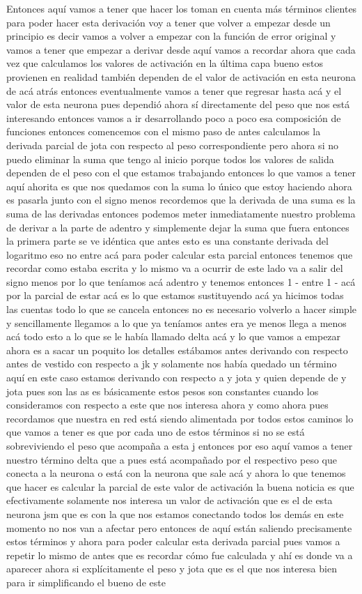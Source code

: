 Entonces aquí vamos a tener que hacer los toman en cuenta más términos clientes para poder hacer esta derivación voy a tener que volver a empezar desde un principio es decir vamos a volver a empezar con la función de error original y vamos a tener que empezar a derivar desde aquí vamos a recordar ahora que cada vez que calculamos los valores de activación en la última capa bueno estos provienen en realidad también dependen de el valor de activación en esta neurona de acá atrás entonces eventualmente vamos a tener que regresar hasta acá y el valor de esta neurona pues dependió ahora sí directamente del peso que nos está interesando entonces vamos a ir desarrollando poco a poco esa composición de funciones entonces comencemos con el mismo paso de antes calculamos la derivada parcial de jota con respecto al peso correspondiente pero ahora si no puedo eliminar la suma que tengo al inicio porque todos los valores de salida dependen de el peso con el que estamos trabajando entonces lo que vamos a tener aquí ahorita es que nos quedamos con la suma lo único que estoy haciendo ahora es pasarla junto con el signo menos recordemos que la derivada de una suma es la suma de las derivadas entonces podemos meter inmediatamente nuestro problema de derivar a la parte de adentro y simplemente dejar la suma que fuera entonces la primera parte se ve idéntica que antes esto es una constante derivada del logaritmo eso no entre acá para poder calcular esta parcial entonces tenemos que recordar como estaba escrita y lo mismo va a ocurrir de este lado va a salir del signo menos por lo que teníamos acá adentro y tenemos entonces 1 - entre 1 - acá por la parcial de estar acá es lo que estamos sustituyendo acá ya hicimos todas las cuentas todo lo que se cancela entonces no es necesario volverlo a hacer simple y sencillamente llegamos a lo que ya teníamos antes era ye menos llega a menos acá todo esto a lo que se le había llamado delta acá y lo que vamos a empezar ahora es a sacar un poquito los detalles estábamos antes derivando con respecto antes de vestido con respecto a jk y solamente nos había quedado un término aquí en este caso estamos derivando con respecto a y jota y quien depende de y jota pues son las as es básicamente estos pesos son constantes cuando los consideramos con respecto a este que nos interesa ahora y como ahora pues recordamos que nuestra en red está siendo alimentada por todos estos caminos lo que vamos a tener es que por cada uno de estos términos si no se está sobreviviendo el peso que acompaña a esta j entonces por eso aquí vamos a tener nuestro término delta que a pues está acompañado por el respectivo peso que conecta a la neurona o está con la neurona que sale acá y ahora lo que tenemos que hacer es calcular la parcial de este valor de activación la buena noticia es que efectivamente solamente nos interesa un valor de activación que es el de esta neurona jsm que es con la que nos estamos conectando todos los demás en este momento no nos van a afectar pero entonces de aquí están saliendo precisamente estos términos y ahora para poder calcular esta derivada parcial pues vamos a repetir lo mismo de antes que es recordar cómo fue calculada y ahí es donde va a aparecer ahora si explícitamente el peso y jota que es el que nos interesa bien para ir simplificando el bueno de este 